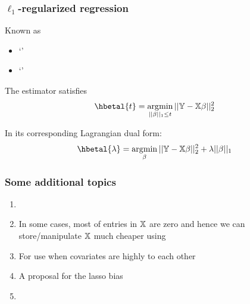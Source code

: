 \documentclass{beamer}
\begin{document}
\title{}
\subtitle{\classTitle}
\date{}



\begin{frame}
\maketitle
%
\organization
%
\end{frame}

\begin{frame}[fragile]
\frametitle{$\ell_1$-regularized regression}
Known as 
\begin{itemize}
\item `' 
\item `' 
\end{itemize}
\vsp

The estimator satisfies
\[
\hbetal{t} = \argmin_{ ||\beta||_1 \leq t}  ||\mathbb{Y}-\X\beta||_2^2 
\]

In its corresponding Lagrangian dual form:
\[
\hbetal{\lambda} = \argmin_{\beta} ||\mathbb{Y}-\X\beta||_2^2 + \lambda ||\beta||_1
\]
\end{frame}

\begin{frame}[fragile]
\frametitle{Some additional topics}
\begin{enumerate}
\item {}
\item {} In some cases, most of entries in $\mathbb{X}$ are zero and hence
we can store/manipulate $\mathbb{X}$ much cheaper using 
\item {} For use when covariates are highly  to each other 
\item {} A proposal for  the lasso bias
\item {} 
\end{enumerate}
\end{frame}

\end{document}
